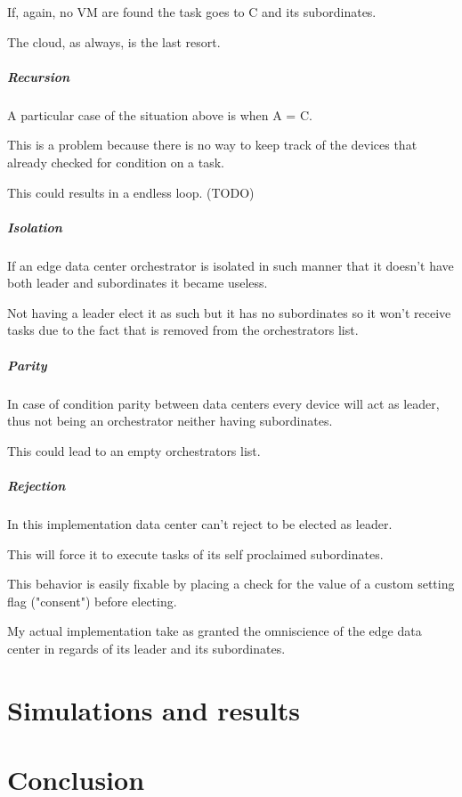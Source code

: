 \documentclass[12pt]{report}
\begin{document}
If, again, no VM are found the task goes to C and its subordinates.

The cloud, as always, is the last resort.


\paragraph{Recursion}
A particular case of the situation above is when A = C.

This is a problem because there is no way to keep track of the devices that already checked for condition on a task.

This could results in a endless loop. (TODO)


\paragraph{Isolation}
If an edge data center orchestrator is isolated in such manner that it doesn't have both leader and subordinates it became useless.

Not having a leader elect it as such but it has no subordinates so it won't receive tasks due to the fact that is removed from the orchestrators list.

\paragraph{Parity}
In case of condition parity between data centers every device will act as leader, thus not being an orchestrator neither having subordinates.

This could lead to an empty orchestrators list.

\paragraph{Rejection}
In this implementation data center can't reject to be elected as leader. 

This will force it to execute tasks of its self proclaimed subordinates.

This behavior is easily fixable by placing a check for the value of a custom setting flag ("consent") before electing.

My actual implementation take as granted the omniscience of the edge data center in regards of its leader and its subordinates.

\chapter{Simulations and results}

\chapter{Conclusion}

\printbibliography
\end{document}
